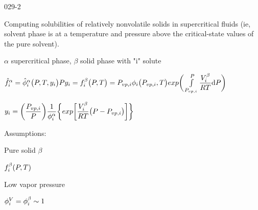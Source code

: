 \begin{mitframe}{029-2}


	\begin{listone}

		\item Computing solubilities of relatively nonvolatile solids in supercritical fluids (ie, solvent phase is at a temperature and pressure above the critical-state values of the pure solvent).
    
    	\item $\alpha$ supercritical phase, $\beta$ solid phase with "i" solute
    
    	\item $\hat{\fug}_{\state}^{\tdiff}=\hat{\eleccoeff}_{\state}^{\tdiff}\big(\p,\Temp,y_{\state}\big)\p{y}_{\state}=\fug_{\state}^{\texpcoeff}\big(\p,\Temp\big)=\p_{vp,\state}\eleccoeff_{\state}\big(\p_{vp,\state},\Temp\big)exp\bigg(\int\limits_{\p_{vp,\state}}^{\p}\dfrac{\vol_{\state}^{\texpcoeff}}{\gasconst\Temp}\mathrm{d}\p\bigg)$
        
    
    	\item$y_{\state}=\bigg(\dfrac{\p_{vp,\state}}{\p}\bigg)\dfrac{1}{\eleccoeff_{\state}^{\tdiff}}\bigg\{exp\bigg[\dfrac{\vol_{\state}^{\texpcoeff}}{\gasconst\Temp}\big(\p-\p_{vp,\state}\big)\bigg]\bigg\}$
    
    	\item Assumptions:
    
    	\begin{listtwo}
        
        	\item Pure solid $\beta$
        	
            \begin{listthree}
            
            	\item $\fug_{\state}^{\texpcoeff}(\p,\Temp)$

			\end{listthree}
            
        	\item Low vapor pressure
        	
            \begin{listthree}
            
            	\item$\eleccoeff_{\state}^{\vol}=\eleccoeff_{\state}^{\texpcoeff}\sim{1}$


\end{listthree}
\end{listtwo}
\end{listone}
\end{mitframe}
